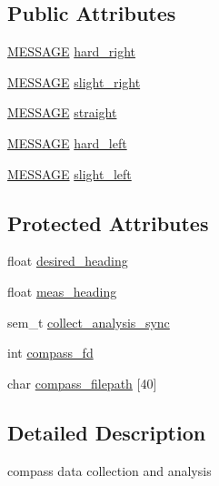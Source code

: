 \subsection*{Public Attributes}
\begin{DoxyCompactItemize}
\item 
\hyperlink{SUBSYS__COMMANDS_8h_ad814416fc1a8c675bea2687d96088a8f}{M\-E\-S\-S\-A\-G\-E} \hyperlink{classCompass_a15cd7eda15b824c8d5821a46667b861c}{hard\-\_\-right}
\item 
\hyperlink{SUBSYS__COMMANDS_8h_ad814416fc1a8c675bea2687d96088a8f}{M\-E\-S\-S\-A\-G\-E} \hyperlink{classCompass_a9e9ff6610d60e6fd915984a3f3e40e13}{slight\-\_\-right}
\item 
\hyperlink{SUBSYS__COMMANDS_8h_ad814416fc1a8c675bea2687d96088a8f}{M\-E\-S\-S\-A\-G\-E} \hyperlink{classCompass_aa11186aa6caf9dced42940552bf24da2}{straight}
\item 
\hyperlink{SUBSYS__COMMANDS_8h_ad814416fc1a8c675bea2687d96088a8f}{M\-E\-S\-S\-A\-G\-E} \hyperlink{classCompass_a5cbc2cebdd91222c5ccf5bd28aa35ced}{hard\-\_\-left}
\item 
\hyperlink{SUBSYS__COMMANDS_8h_ad814416fc1a8c675bea2687d96088a8f}{M\-E\-S\-S\-A\-G\-E} \hyperlink{classCompass_a9e0a282c1253451fd7967646074102ee}{slight\-\_\-left}
\end{DoxyCompactItemize}
\subsection*{Protected Attributes}
\begin{DoxyCompactItemize}
\item 
float \hyperlink{classCompass_ac888a4dacdc477e53c99fe8e110966ae}{desired\-\_\-heading}
\item 
float \hyperlink{classCompass_af0f87a131e2c9833f7d52bed1a39bf75}{meas\-\_\-heading}
\item 
sem\-\_\-t \hyperlink{classCompass_ace6e13b91461366609f093fef09188d9}{collect\-\_\-analysis\-\_\-sync}
\item 
int \hyperlink{classCompass_a44b0e4223918e3b139e54d54a0e3daad}{compass\-\_\-fd}
\item 
char \hyperlink{classCompass_a6ff33d93efe79539c75dbee45efdc97c}{compass\-\_\-filepath} \mbox{[}40\mbox{]}
\end{DoxyCompactItemize}


\subsection{Detailed Description}
compass data collection and analysis 

